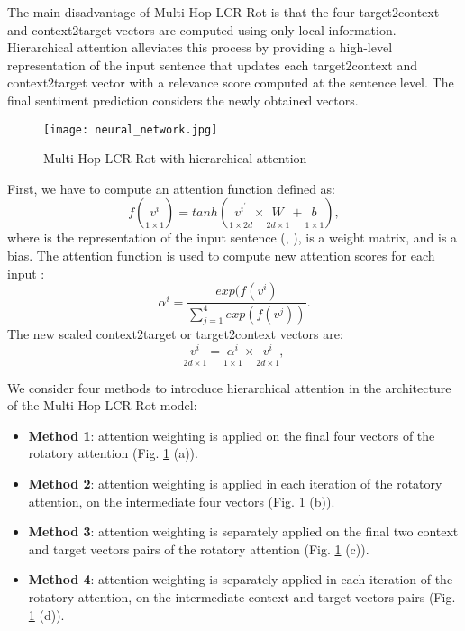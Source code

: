 \documentclass[hidelinks]{llncs}
\begin{document}
The main disadvantage of Multi-Hop LCR-Rot is that the four target2context and context2target vectors are computed using only local information. Hierarchical attention alleviates this process by providing a high-level representation of the input sentence that updates each target2context and context2target vector with a relevance score computed at the sentence level. The final sentiment prediction considers the newly obtained vectors.

\begin{figure}[!b]
\vspace{-0.5cm}
\centering
\texttt{[image: neural\_network.jpg]}
\caption{Multi-Hop LCR-Rot with hierarchical attention} 	
\label{fig:figure_1}
\end{figure} 

First, we have to compute an attention function  defined as:
\begin {equation}
\label{equation11}
f(\underset{1 \times 1}{v^i_{}}) = tanh(\underset{1 \times 2d}{v^{i^'}_{}} \times \underset{2d \times 1}{W_{ }^{ }} + \underset{1 \times 1}{b_{ }^{ }}),
\end {equation}
where  is the representation  of the input sentence (, ),  is a weight matrix, and  is a bias. The attention function  is used to compute new attention scores  for each input :
\begin {equation}
\label{equation12}
\alpha^i = \frac{exp(f(v^i)}{\sum_{j=1}^4 exp(f(v^j))}.
\end {equation}
The new scaled context2target or target2context vectors are:
\begin {equation}
\label{equation13}
\underset{2d \times 1}{v^i_{ }} = \underset{1 \times 1}{\alpha^i_{ }} \times \underset{2d \times 1}{v^i_{ }},
\end {equation}


We consider four methods to introduce hierarchical attention in the architecture of the Multi-Hop LCR-Rot model:
\begin{itemize}


    \item \textbf{Method 1}: attention weighting is applied on the final four vectors of the rotatory attention (Fig. \ref{fig:figure_1} (a)).
    \item \textbf{Method 2}: attention weighting is applied in each iteration of the rotatory attention, on the intermediate four vectors (Fig. \ref{fig:figure_1} (b)).
    \item \textbf{Method 3}: attention weighting is separately applied on the final two context and target vectors pairs of the rotatory attention (Fig. \ref{fig:figure_1} (c)).
    \item \textbf{Method 4}: attention weighting is separately applied in each iteration of the rotatory attention, on the intermediate context and target vectors pairs (Fig. \ref{fig:figure_1} (d)).
\end{itemize}
\end{document}
